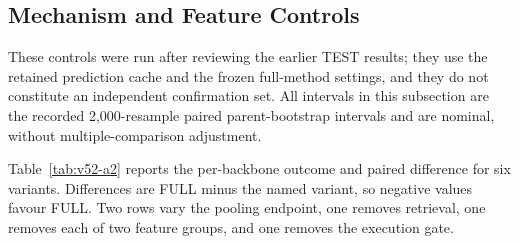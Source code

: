 \documentclass{article}
\begin{document}
\subsection{Mechanism and Feature Controls}
\label{app:estimation-analyses}
These controls were run after reviewing the earlier TEST results; they use the retained
prediction cache and the frozen full-method settings, and they do not constitute an
independent confirmation set. All intervals in this subsection are the recorded
2,000-resample paired parent-bootstrap intervals and are nominal, without
multiple-comparison adjustment.

Table~\ref{tab:v52-a2} reports the per-backbone outcome and paired difference for six
variants. Differences are FULL minus the named variant, so negative values favour FULL.
Two rows vary the pooling endpoint, one removes retrieval, one removes each of two feature
groups, and one removes the execution gate.
\end{document}
